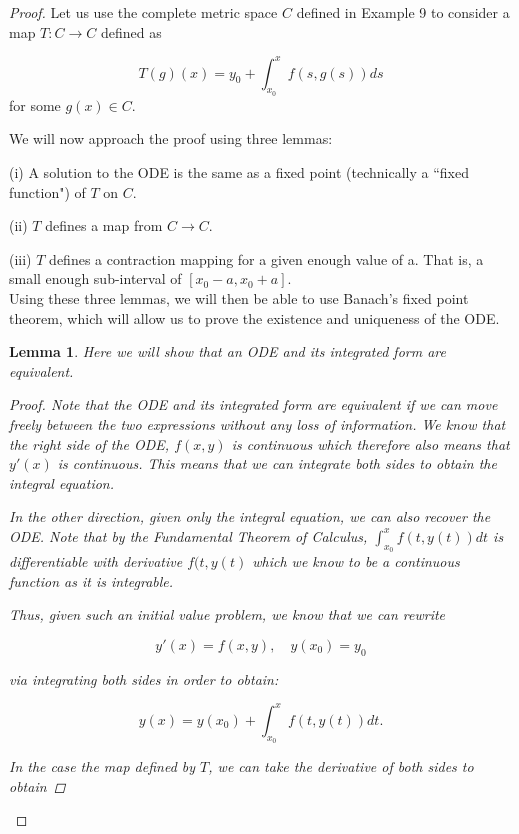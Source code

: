 \documentclass{article}
\newtheorem{lemma}[theorem]{Lemma}
\theoremstyle{remark}
\begin{document}
\begin{proof}

Let us use the complete metric space $C$ defined in Example 9 to consider a map $T: C \to C$ defined as 

$$T(g)(x) = y_0 + \int_{x_0}^xf(s, g(s))ds$$
for some $g(x) \in C$. 

We will now approach the proof using three lemmas:
\indent \item[(i)] A solution to the ODE is the same as a fixed point (technically a ``fixed function") of $T$ on $C$.
\indent \item[(ii)] $T$ defines a map from $C \to C$.
\indent \item[(iii)] $T$ defines a contraction mapping for a given enough value of a. That is, a small enough sub-interval of $[x_0-a, x_0+a]$. \\

Using these three lemmas, we will then be able to use Banach's fixed point theorem, which will allow us to prove the existence and uniqueness of the ODE.


\begin{lemma} 
    Here we will show that an ODE and its integrated form are equivalent. \\
    \begin{proof}
        Note that the ODE and its integrated form are equivalent if we can move freely between the two expressions without any loss of information. We know that the right side of the ODE, $f(x,y)$ is continuous which therefore also means that $y'(x)$ is continuous. This means that we can integrate both sides to obtain the integral equation.
        
        In the other direction, given only the integral equation, we can also recover the ODE. Note that by the Fundamental Theorem of Calculus, $\int_{x_0}^{x}f(t,y(t))dt$ is differentiable with derivative $f(t,y(t)$ which we know to be a continuous function as it is integrable. 

        Thus, given such an initial value problem, we know that we can rewrite

        $$y'(x) = f(x,y), \quad y(x_0) = y_0$$

        via integrating both sides in order to obtain:

        $$ y(x) = y(x_0) + \int_{x_0}^{x}f(t,y(t))dt.$$

        In the case the map defined by $T$, we can take the derivative of both sides to obtain


\end{proof}
\end{lemma}
\end{proof}
\end{document}
